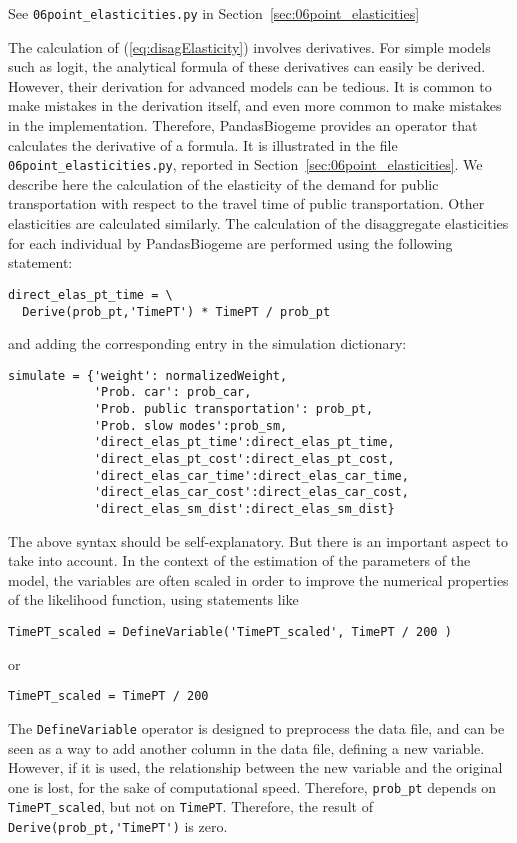 \documentclass[12pt,a4paper]{article}
\newcommand{\req}[1]{(\ref{#1})}
\begin{document}
\begin{flushright}
See \lstinline$06point_elasticities.py$ in Section~\ref{sec:06point_elasticities}
\end{flushright}

The calculation of \req{eq:disagElasticity} involves derivatives. For
simple models such as logit, the analytical formula of these
derivatives can easily be derived. However, their derivation for
advanced models can be tedious. It is common to make mistakes in the
derivation itself, and even more common to make mistakes in the
implementation. Therefore, PandasBiogeme provides an operator that
calculates the derivative of a formula. It is illustrated in the
file \lstinline$06point_elasticities.py$, reported in
Section~\ref{sec:06point_elasticities}. We describe here the
calculation of the elasticity of the demand for public transportation
with respect to the travel time of public transportation. Other
elasticities are calculated similarly.  The calculation of the
 disaggregate elasticities for each individual by PandasBiogeme are
 performed using the following statement:
\begin{lstlisting}
direct_elas_pt_time = \
  Derive(prob_pt,'TimePT') * TimePT / prob_pt
\end{lstlisting}
and adding the corresponding entry in the simulation dictionary:
\begin{lstlisting}
simulate = {'weight': normalizedWeight,
            'Prob. car': prob_car,
            'Prob. public transportation': prob_pt,
            'Prob. slow modes':prob_sm,
            'direct_elas_pt_time':direct_elas_pt_time,
            'direct_elas_pt_cost':direct_elas_pt_cost,
            'direct_elas_car_time':direct_elas_car_time,
            'direct_elas_car_cost':direct_elas_car_cost,
            'direct_elas_sm_dist':direct_elas_sm_dist}
\end{lstlisting}

The above syntax should be self-explanatory. But there is an important
aspect to take into account. In the context of the estimation of the
parameters of the model, the variables are often scaled in order to
improve the numerical properties of the likelihood function, using
statements like
\begin{lstlisting}
TimePT_scaled = DefineVariable('TimePT_scaled', TimePT / 200 )
\end{lstlisting}
or
\begin{lstlisting}
TimePT_scaled = TimePT / 200
\end{lstlisting}
The \lstinline$DefineVariable$ operator is designed to preprocess the
data file, and can be seen as a way to add another column in the data
file, defining a new variable. However, if it is used, the
relationship between the new variable and the original one is lost,
for the sake of computational speed.
Therefore, \lstinline+prob_pt+ depends on \lstinline+TimePT_scaled+,
but  not  on \lstinline+TimePT+. Therefore, the result of
\lstinline+Derive(prob_pt,'TimePT')+ is zero.
\end{document}
